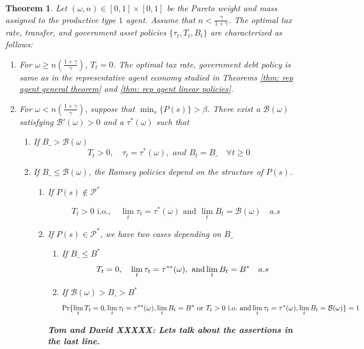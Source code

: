 \documentclass[thmsb,11pt]{article}
\newtheorem{theorem}{Theorem}
\begin{document}
\begin{theorem}
\label{thm heterogeneous agents}
Let $(\omega,n) \in [0,1] \times [0,1]$ be the Pareto weight and mass assigned to the  productive type $1$ agent.  Assume that $n<\frac{\gamma}{1+\gamma}$.
The optimal tax rate, transfer, and government asset policies $\{\tau_t,T_t,B_t\}$ are characterized as follows:


\begin{enumerate}
 \item For $\omega\geq n \left(\frac{1+\gamma}{\gamma}\right)$,  $T_t=0$.  The optimal tax rate, government debt policy is same as in the representative agent economy studied in
 Theorems \ref{thm: rep agent general theorem} and \ref{thm: rep agent linear policies}.
 \item For $\omega< n \left(\frac{1+\gamma}{\gamma}\right)$, suppose that $\min_{s}\{P(s)\}>\beta$. There exist  a $\mathcal{B}(\omega)$  satisfying $\mathcal{B}'(\omega)>0$ and a $\tau^*(\omega)$ such that
 \begin{enumerate}
  \item If $B\_>\mathcal{B(\omega)}$
\[T_t>0, \quad \tau_t=\tau^*(\omega), \textit{ and } B_t=B\_ \quad \forall t \geq 0 \]
\item If $B\_\leq \mathcal{B(\omega)}$, the Ramsey policies depend on the structure of $P(s)$.
\begin{enumerate}
 \item If $P(s)\not \in \mathcal{P}^*$

   \[ T_t>0 \text{ i.o.},\quad \lim_t\tau_t=\tau^*(\omega) \text{ and } \lim_tB_t=\mathcal{B}(\omega)\quad \textit{a.s}\]

 \item If $P(s)\in \mathcal{P}^*$, we have two cases depending on $B\_$
\begin{enumerate}
 \item If $B\_\leq B^*$
 \[T_t = 0, \quad \lim_t \tau_t=\tau^{**} (\omega), \ {\rm  and } \lim_tB_t=  B^*\quad a.s \]
\item If $\mathcal{B}(\omega)>B\_>B^*$
\small
\[\Pr\{\lim_t T_t = 0, \lim_t \tau_t=\tau^{**}(\omega),\lim_tB_t=  B^* \textrm{ or }  T_t>0 \text{ i.o.} \ {\rm and } \lim_t\tau_t=\tau^*(\omega), \lim_tB_t=\mathcal{B}(\omega) \}=1 \]
 \normalsize
\end{enumerate}

\textbf{Tom and David XXXXX: Lets talk about the assertions in the last line.}


 \end{enumerate}

 \end{enumerate}

 \end{enumerate}


\end{theorem}
\end{document}
